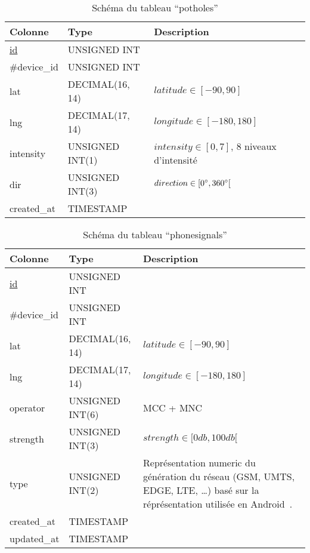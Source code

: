\begin{table}[H]
   \centering
   \begin{tabular}{|l|p{4cm}|p{8cm}|}
   \hline
   \textbf{Colonne} & \textbf{Type} & \textbf{Description} \\
   \hline
   \underline{id} & UNSIGNED INT &\\ \hline
   \#device\_id & UNSIGNED INT & \\ \hline
   lat & DECIMAL(16, 14) & $latitude \in [-90, 90]$\\ \hline
   lng & DECIMAL(17, 14) & $longitude \in [-180, 180]$\\ \hline
   intensity & UNSIGNED INT(1) & $intensity \in [0, 7]$, 8 niveaux d'intensité \\ \hline
   dir & UNSIGNED INT(3) & $direction \in [0\degree, 360\degree[$ \\ \hline
   created\_at & TIMESTAMP & \\ \hline
   \end{tabular}
   \caption{Schéma du tableau ``potholes''}
\end{table}

\begin{table}[H]
   \centering
   \begin{tabular}{|l|p{4cm}|p{8cm}|}
   \hline
   \textbf{Colonne} & \textbf{Type} & \textbf{Description} \\
   \hline
   \underline{id} & UNSIGNED INT &\\ \hline
   \#device\_id & UNSIGNED INT & \\ \hline
   lat & DECIMAL(16, 14) & $latitude \in [-90, 90]$\\ \hline
   lng & DECIMAL(17, 14) & $longitude \in [-180, 180]$\\ \hline
   operator & UNSIGNED INT(6) & \acrfull{MCC} + \acrfull{MNC} \\ \hline
   strength & UNSIGNED INT(3) & $strength \in [0db, 100db[$ \\ \hline
   type & UNSIGNED INT(2) & Représentation numeric du génération du réseau (GSM, UMTS, EDGE, LTE, \ldots) basé sur la réprésentation utilisée en Android~\cite{getNetworkType}. \\ \hline
   created\_at & TIMESTAMP & \\ \hline
   updated\_at & TIMESTAMP & \\ \hline
   \end{tabular}
   \caption{Schéma du tableau ``phonesignals''}
\end{table}

